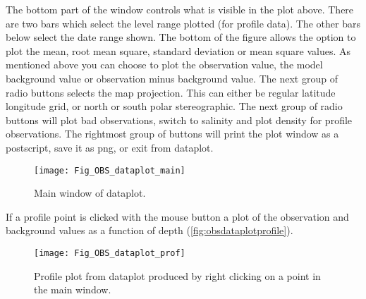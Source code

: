 \documentclass[../main/NEMO_manual]{subfiles}
\begin{document}
The bottom part of the window controls what is visible in the plot above.
There are two bars which select the level range plotted (for profile data).
The other bars below select the date range shown.
The bottom of the figure allows the option to plot the mean, root mean square, standard deviation or
mean square values.
As mentioned above you can choose to plot the observation value, the model background value or
observation minus background value.
The next group of radio buttons selects the map projection.
This can either be regular latitude longitude grid, or north or south polar stereographic.
The next group of radio buttons will plot bad observations, switch to salinity and
plot density for profile observations.
The rightmost group of buttons will print the plot window as a postscript, save it as png, or exit from dataplot.

\begin{figure}
  \begin{center}
    \texttt{[image: Fig\_OBS\_dataplot\_main]}
    \caption{
      \protect\label{fig:obsdataplotmain}
      Main window of dataplot.
    }
  \end{center}
\end{figure}

If a profile point is clicked with the mouse button a plot of the observation and background values as
a function of depth (\autoref{fig:obsdataplotprofile}).

\begin{figure}
  \begin{center}
    \texttt{[image: Fig\_OBS\_dataplot\_prof]}
    \caption{
      \protect\label{fig:obsdataplotprofile}
      Profile plot from dataplot produced by right clicking on a point in the main window.
    }
  \end{center}
\end{figure}

\biblio

\pindex
\end{document}
